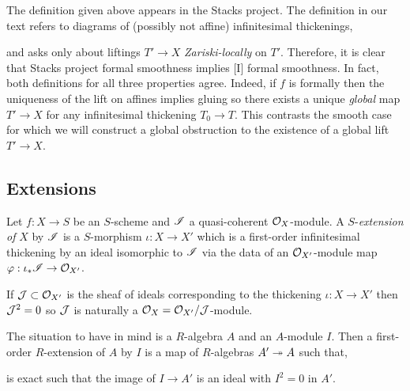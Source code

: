 \documentclass[12pt]{article}
\begin{document}
\begin{rmk}
The definition given above appears in the Stacks project. The definition in our text refers to diagrams of (possibly not affine) infinitesimal thickenings,
\begin{center}
\end{center}
and asks only about liftings $T' \to X$ \textit{Zariski-locally} on $T'$. Therefore, it is clear that Stacks project formal smoothness implies [I] formal smoothness. In fact, both definitions for all three properties agree. Indeed, if $f$ is formally \etale then the uniqueness of the lift on affines implies gluing so there exists a unique \textit{global} map $T' \to X$ for any infinitesimal thickening $T_0 \to T$. This contrasts the smooth case for which we will construct a global obstruction to the existence of a global lift $T' \to X$.
\end{rmk}

\subsection{Extensions}

\begin{defn}
Let $f : X \to S$ be an $S$-scheme and $\mathscr{I}$ a quasi-coherent $\mathcal{O}_{X}$-module. A $S$-\textit{extension of} $X$ by $\mathscr{I}$ is a $S$-morphism $\iota : X \to X'$ which is a first-order infinitesimal thickening by an ideal isomorphic to $\mathscr{I}$ via the data of an $\mathcal{O}_{X'}$-module map $\varphi : \iota_* \mathscr{I} \to \mathcal{O}_{X'}$.
\end{defn}

\begin{rmk}
If $\mathcal{J} \subset \mathcal{O}_{X'}$ is the sheaf of ideals corresponding to the thickening $\iota : X \to X'$ then $\mathcal{J}^2 = 0$ so $\mathcal{J}$ is naturally a $\mathcal{O}_{X} = \mathcal{O}_{X'}/\mathcal{J}$-module.
\end{rmk}

\begin{rmk}
The situation to have in mind is a $R$-algebra $A$ and an $A$-module $I$. Then a first-order $R$-extension of $A$ by $I$ is a map of $R$-algebras $A' \twoheadrightarrow A$ such that,
\begin{center}
\end{center}
is exact such that the image of $I \to A'$ is an ideal with $I^2 = 0$ in $A'$.
\end{rmk}
\end{document}
